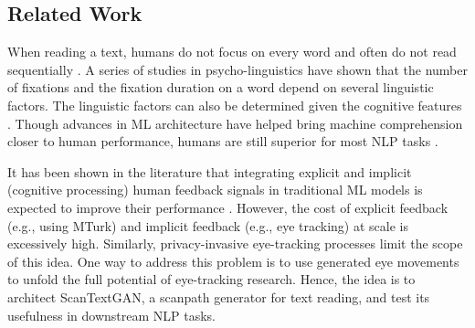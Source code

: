 




\subsection{Related Work}
\label{sec:RelatedWork}

When reading a text, humans do not focus on every word and often do not read sequentially \cite{Just1980}. A series of studies in psycho-linguistics have shown that the number of fixations and the fixation duration on a word depend on several linguistic factors. The linguistic factors can also be determined given the cognitive features \cite{clifton2007eye, demberg2008data}.
Though advances in ML architecture have helped bring machine comprehension closer to human performance, humans are still superior for most NLP tasks \cite{blohm-etal-2018-comparing,xia-etal-2019-automatic}. 

It has been shown in the literature that integrating explicit \citep{bai2022training,ouyang2022training} and implicit (cognitive processing) human feedback signals in traditional ML models is expected to improve their performance \cite{Just1980}. However, the cost of explicit feedback (e.g., using MTurk) and implicit feedback (e.g., eye tracking) at scale is excessively high. Similarly, privacy-invasive eye-tracking processes limit the scope of this idea. One way to address this problem is to use generated eye movements to unfold the full potential of eye-tracking research. Hence, the idea is to architect ScanTextGAN, a scanpath generator for text reading, and test its usefulness in downstream NLP tasks. 

